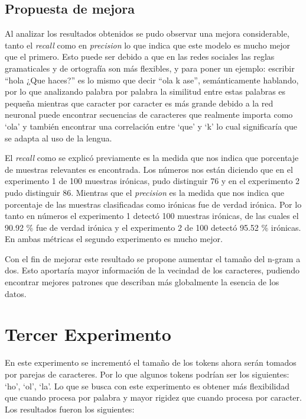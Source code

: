 		\subsection{Propuesta de mejora} %
		
		\par Al analizar los resultados obtenidos se pudo observar una mejora considerable, tanto el \textit{recall} como en \textit{precision} lo que indica que este modelo es mucho mejor que el primero. Esto puede ser debido a que en las redes sociales las reglas gramaticales y de ortografía son más flexibles, y para poner un ejemplo: escribir
		``hola ¿Que haces?'' es lo mismo que decir ``ola k ase'', semánticamente hablando, por lo que analizando palabra por palabra la similitud entre estas palabras es pequeña mientras que caracter por caracter es más grande debido a la red neuronal puede encontrar secuencias de caracteres que realmente importa como `ola'  y también encontrar una correlación entre `que' y `k' lo cual significaría que se adapta al uso de la lengua. 
		
		\par El \textit{recall} como se explicó previamente es la medida que nos indica que porcentaje de muestras relevantes es encontrada. Los números nos están diciendo que en el experimento 1 de 100 muestras irónicas, pudo distinguir 76 y en el experimento 2 pudo distinguir 86. Mientras que el \textit{precision} es la medida que nos indica que porcentaje de las muestras clasificadas como irónicas fue de verdad irónica. Por lo tanto en números el experimento 1 detectó 100 muestras irónicas, de las cuales el 90.92 \% fue de verdad irónica y el experimento 2 de 100 detectó 95.52 \% irónicas. En ambas métricas el segundo experimento es mucho mejor.
	    
	    \par Con el fin de mejorar este resultado se propone aumentar el tamaño del n-gram a dos. Esto aportaría mayor información de la vecindad de los caracteres, pudiendo encontrar mejores patrones que describan más globalmente la esencia de los datos.
	    
	\section{Tercer Experimento}
	\par En este experimento se incrementó el tamaño de los tokens ahora serán tomados por parejas de caracteres. Por lo que algunos tokens podrían ser los siguientes: `ho', `ol', `la'. Lo que se busca con este experimento es obtener más flexibilidad que cuando procesa por palabra y mayor rigidez que cuando procesa por caracter. Los resultados fueron los siguientes:
	

